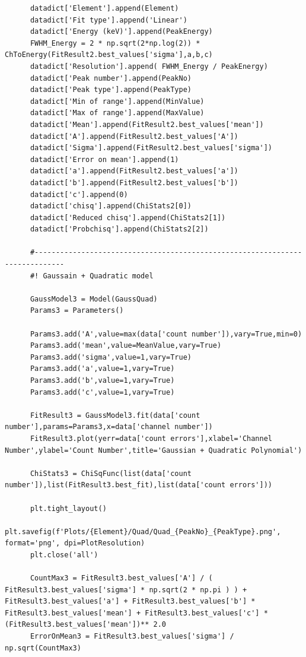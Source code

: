 \documentclass[11pt,a4paper]{article}
\begin{document}
\begin{verbatim}
      datadict['Element'].append(Element)
      datadict['Fit type'].append('Linear')
      datadict['Energy (keV)'].append(PeakEnergy)
      FWHM_Energy = 2 * np.sqrt(2*np.log(2)) * ChToEnergy(FitResult2.best_values['sigma'],a,b,c)
      datadict['Resolution'].append( FWHM_Energy / PeakEnergy)
      datadict['Peak number'].append(PeakNo)
      datadict['Peak type'].append(PeakType)
      datadict['Min of range'].append(MinValue)
      datadict['Max of range'].append(MaxValue)
      datadict['Mean'].append(FitResult2.best_values['mean'])
      datadict['A'].append(FitResult2.best_values['A'])
      datadict['Sigma'].append(FitResult2.best_values['sigma'])
      datadict['Error on mean'].append(1)
      datadict['a'].append(FitResult2.best_values['a'])
      datadict['b'].append(FitResult2.best_values['b'])
      datadict['c'].append(0)
      datadict['chisq'].append(ChiStats2[0])
      datadict['Reduced chisq'].append(ChiStats2[1])
      datadict['Probchisq'].append(ChiStats2[2])

      #-----------------------------------------------------------------------------
      #! Gaussain + Quadratic model 

      GaussModel3 = Model(GaussQuad)
      Params3 = Parameters()

      Params3.add('A',value=max(data['count number']),vary=True,min=0)
      Params3.add('mean',value=MeanValue,vary=True)
      Params3.add('sigma',value=1,vary=True)
      Params3.add('a',value=1,vary=True)
      Params3.add('b',value=1,vary=True)
      Params3.add('c',value=1,vary=True)

      FitResult3 = GaussModel3.fit(data['count number'],params=Params3,x=data['channel number'])
      FitResult3.plot(yerr=data['count errors'],xlabel='Channel Number',ylabel='Count Number',title='Gaussian + Quadratic Polynomial')

      ChiStats3 = ChiSqFunc(list(data['count number']),list(FitResult3.best_fit),list(data['count errors']))

      plt.tight_layout()
      plt.savefig(f'Plots/{Element}/Quad/Quad_{PeakNo}_{PeakType}.png', format='png', dpi=PlotResolution)
      plt.close('all')

      CountMax3 = FitResult3.best_values['A'] / ( FitResult3.best_values['sigma'] * np.sqrt(2 * np.pi ) ) + FitResult3.best_values['a'] + FitResult3.best_values['b'] * FitResult3.best_values['mean'] + FitResult3.best_values['c'] * (FitResult3.best_values['mean'])** 2.0
      ErrorOnMean3 = FitResult3.best_values['sigma'] / np.sqrt(CountMax3)


\end{verbatim}
\end{document}
